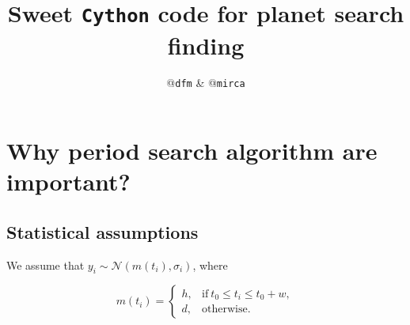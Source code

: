 \documentclass{article}
\title{Sweet \texttt{Cython} code for planet search finding}
\author{@\texttt{dfm} \& @\texttt{mirca}}
\begin{document}
\maketitle
\section{Why period search algorithm are important?}
\subsection{Statistical assumptions}
We assume that $y_i \sim \mathcal{N}(m(t_i), \sigma_i)$, where

\begin{equation}
m(t_i) =
\left\{
    \begin{array}{ll}
        h, & \text{if}~t_0 \leq t_i \leq t_0 + w ,\\
        d, & \text{otherwise}.
    \end{array}
\right.
\end{equation}
\end{document}
